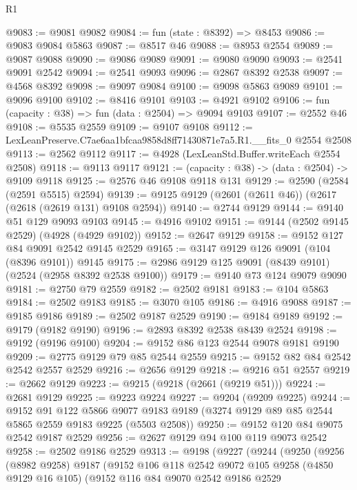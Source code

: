 \begin{lexlean}{R1}
\begin{coremodule}
@9083 := @9081 @9082
@9084 := fun (state : @8392) => @8453
@9086 := @9083 @9084 @5863
@9087 := @8517 @46
@9088 := @8953 @2554
@9089 := @9087 @9088
@9090 := @9086 @9089
@9091 := @9080 @9090
@9093 := @2541 @9091 @2542
@9094 := @2541 @9093
@9096 := @2867 @8392 @2538
@9097 := @4568 @8392
@9098 := @9097 @9084
@9100 := @9098 @5863 @9089
@9101 := @9096 @9100
@9102 := @8416 @9101
@9103 := @4921 @9102
@9106 := fun (capacity : @38) => fun (data : @2504) => @9094 @9103
@9107 := @2552 @46
@9108 := @5535 @2559
@9109 := @9107 @9108
@9112 := LexLeanPreserve.C7ae6aa1bfcaa9858d8ff71430871e7a5.R1.__fits_0 @2554 @2508
@9113 := @2562 @9112
@9117 := @4928 (LexLeanStd.Buffer.writeEach @2554 @2508)
@9118 := @9113 @9117
@9121 := (capacity : @38) -> (data : @2504) -> @9109 @9118
@9125 := @2576 @46 @9108 @9118 @131
@9129 := @2590 (@2584 (@2591 @5515) @2594)
@9139 := @9125 @9129 (@2601 (@2611 @46)) (@2617 (@2618 (@2619 @131) @9108 @2594))
@9140 := @2744 @9129
@9144 := @9140 @51 @129 @9093 @9103
@9145 := @4916 @9102
@9151 := @9144 (@2502 @9145 @2529) (@4928 (@4929 @9102))
@9152 := @2647 @9129
@9158 := @9152 @127 @84 @9091 @2542 @9145 @2529
@9165 := @3147 @9129 @126 @9091 (@104 (@8396 @9101)) @9145
@9175 := @2986 @9129 @125 @9091 (@8439 @9101) (@2524 (@2958 @8392 @2538 @9100))
@9179 := @9140 @73 @124 @9079 @9090
@9181 := @2750 @79 @2559
@9182 := @2502 @9181
@9183 := @104 @5863
@9184 := @2502 @9183
@9185 := @3070 @105
@9186 := @4916 @9088
@9187 := @9185 @9186
@9189 := @2502 @9187 @2529
@9190 := @9184 @9189
@9192 := @9179 (@9182 @9190)
@9196 := @2893 @8392 @2538 @8439 @2524
@9198 := @9192 (@9196 @9100)
@9204 := @9152 @86 @123 @2544 @9078 @9181 @9190
@9209 := @2775 @9129 @79 @85 @2544 @2559
@9215 := @9152 @82 @84 @2542 @2542 @2557 @2529
@9216 := @2656 @9129
@9218 := @9216 @51 @2557
@9219 := @2662 @9129
@9223 := @9215 (@9218 (@2661 (@9219 @51)))
@9224 := @2681 @9129
@9225 := @9223 @9224
@9227 := @9204 (@9209 @9225)
@9244 := @9152
    @91
    @122
    @5866
    @9077
    @9183
    @9189
    (@3274 @9129 @89 @85 @2544 @5865 @2559 @9183 @9225 (@5503 @2508))
@9250 := @9152 @120 @84 @9075 @2542 @9187 @2529
@9256 := @2627 @9129 @94 @100 @119 @9073 @2542
@9258 := @2502 @9186 @2529
@9313 := @9198
    (@9227
      (@9244
        (@9250
          (@9256
            (@8982 @9258)
            @9187
            (@9152
              @106
              @118
              @2542
              @9072
              @105
              @9258
              (@4850 @9129 @16 @105)
              (@9152
                @116
                @84
                @9070
                @2542
                @9186
                @2529

\end{coremodule}
\end{lexlean}
